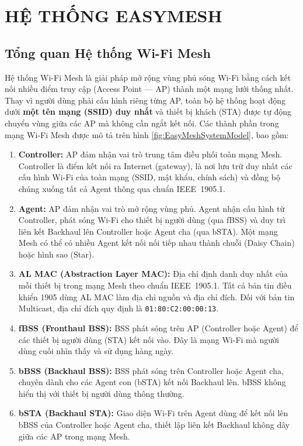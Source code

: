 \chapter{HỆ THỐNG EASYMESH}
\label{chapter:chapter-2}
\section{Tổng quan Hệ thống Wi-Fi Mesh}

Hệ thống Wi-Fi Mesh là giải pháp mở rộng vùng phủ sóng Wi-Fi bằng cách kết nối nhiều
điểm truy cập (Access Point --- AP) thành một mạng lưới thống nhất. Thay vì người dùng
phải cấu hình riêng từng AP, toàn bộ hệ thống hoạt động dưới \textbf{một tên mạng
	(SSID) duy nhất} và thiết bị khách (STA) được tự động chuyển vùng giữa các AP mà
không cần ngắt kết nối. Các thành phần trong mạng Wi-Fi Mesh được mô tả trên hình
\ref{fig:EasyMeshSystemModel}, bao gồm:

\begin{enumerate}
	\item \textbf{Controller:} AP đảm nhận vai trò trung tâm điều phối toàn mạng Mesh.
	Controller là điểm kết nối ra Internet (gateway), là nơi lưu trữ duy nhất các
	cấu hình Wi-Fi của toàn mạng (SSID, mật khẩu, chính sách) và đồng bộ chúng
	xuống tất cả Agent thông qua chuẩn IEEE~1905.1.
	
	\item \textbf{Agent:} AP đảm nhận vai trò mở rộng vùng phủ. Agent nhận cấu hình
	từ Controller, phát sóng Wi-Fi cho thiết bị người dùng (qua fBSS) và duy trì
	liên kết Backhaul lên Controller hoặc Agent cha (qua bSTA). Một mạng Mesh có
	thể có nhiều Agent kết nối nối tiếp nhau thành chuỗi (Daisy Chain) hoặc hình
	sao (Star).
	
	\item \textbf{AL MAC (Abstraction Layer MAC):} Địa chỉ định danh duy nhất của mỗi
	thiết bị trong mạng Mesh theo chuẩn IEEE~1905.1. Tất cả bản tin điều khiển
	1905 dùng AL MAC làm địa chỉ nguồn và địa chỉ đích. Đối với bản tin
	Multicast, địa chỉ đích quy định là \texttt{01:80:C2:00:00:13}.
	
	\item \textbf{fBSS (Fronthaul BSS):} BSS phát sóng trên AP (Controller hoặc Agent)
	để các thiết bị người dùng (STA) kết nối vào. Đây là mạng Wi-Fi mà người
	dùng cuối nhìn thấy và sử dụng hàng ngày.
	
	\item \textbf{bBSS (Backhaul BSS):} BSS phát sóng trên Controller hoặc Agent cha,
	chuyên dành cho các Agent con (bSTA) kết nối Backhaul lên. bBSS không hiển
	thị với thiết bị người dùng thông thường.
	
	\item \textbf{bSTA (Backhaul STA):} Giao diện Wi-Fi trên Agent dùng để kết nối lên
	bBSS của Controller hoặc Agent cha, thiết lập liên kết Backhaul không dây
	giữa các AP trong mạng Mesh.
\end{enumerate}

